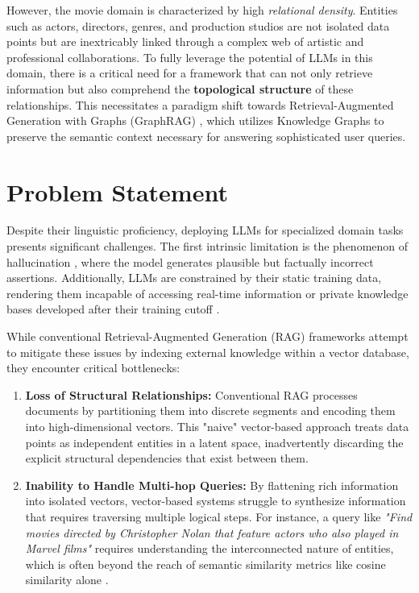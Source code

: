 \documentclass[a4paper, 12pt]{extreport}
\begin{document}
However, the movie domain is characterized by high \textit{relational density}. Entities such as actors, directors, genres, and production studios are not isolated data points but are inextricably linked through a complex web of artistic and professional collaborations. To fully leverage the potential of LLMs in this domain, there is a critical need for a framework that can not only retrieve information but also comprehend the \textbf{topological structure} of these relationships. This necessitates a paradigm shift towards Retrieval-Augmented Generation with Graphs (GraphRAG)  \cite{han2025retrievalaugmentedgenerationgraphsgraphrag}, which utilizes Knowledge Graphs to preserve the semantic context necessary for answering sophisticated user queries.

\section{Problem Statement}
Despite their linguistic proficiency, deploying LLMs for specialized domain tasks presents significant challenges. The first intrinsic limitation is the phenomenon of hallucination \cite{maynez-etal-2020-faithfulness}, where the model generates plausible but factually incorrect assertions. Additionally, LLMs are constrained by their static training data, rendering them incapable of accessing real-time information or private knowledge bases developed after their training cutoff \cite{lewis2020rag}.

While conventional Retrieval-Augmented Generation (RAG) frameworks  \cite{lewis2020rag} attempt to mitigate these issues by indexing external knowledge within a vector database, they encounter critical bottlenecks:

\begin{enumerate}
    \item \textbf{Loss of Structural Relationships:} Conventional RAG processes documents by partitioning them into discrete segments and encoding them into high-dimensional vectors. This "naive" vector-based approach treats data points as independent entities in a latent space, inadvertently discarding the explicit structural dependencies that exist between them.
    
    \item \textbf{Inability to Handle Multi-hop Queries:} By flattening rich information into isolated vectors, vector-based systems struggle to synthesize information that requires traversing multiple logical steps. For instance, a query like \textit{"Find movies directed by Christopher Nolan that feature actors who also played in Marvel films"} requires understanding the interconnected nature of entities, which is often beyond the reach of semantic similarity metrics like cosine similarity alone \cite{han2025retrievalaugmentedgenerationgraphsgraphrag}.
\end{enumerate}
\end{document}
